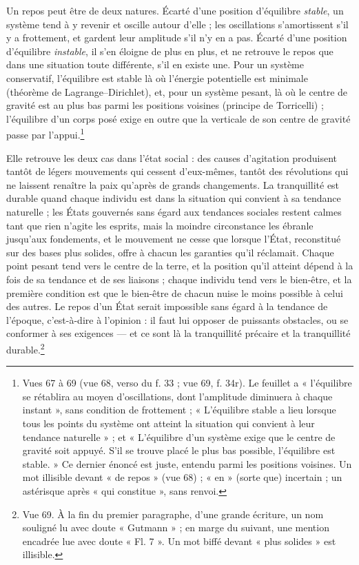 \documentclass[11pt,a4paper]{article}
\begin{document}
Un repos peut être de deux natures. Écarté d'une position d'équilibre
\emph{stable}, un système tend à y revenir et oscille autour d'elle ; les
oscillations s'amortissent s'il y a frottement, et gardent leur amplitude s'il
n'y en a pas. Écarté d'une position d'équilibre \emph{instable}, il s'en éloigne
de plus en plus, et ne retrouve le repos que dans une situation toute
différente, s'il en existe une. Pour un système conservatif, l'équilibre est
stable là où l'énergie potentielle est minimale (théorème de Lagrange–Dirichlet),
et, pour un système pesant, là où le centre de gravité est au plus bas parmi
les positions voisines (principe de Torricelli) ; l'équilibre d'un corps posé
exige en outre que la verticale de son centre de gravité passe par
l'appui.\footnote{Vues 67 à 69 (vue 68, verso du f. 33 ; vue 69, f. 34r). Le
feuillet a « l'équilibre se rétablira au moyen d'oscillations, dont l'amplitude
diminuera à chaque instant », sans condition de frottement ; « L'équilibre
stable a lieu lorsque tous les points du système ont atteint la situation qui
convient à leur tendance naturelle » ; et « L'équilibre d'un système exige que
le centre de gravité soit appuyé. S'il se trouve placé le plus bas possible,
l'équilibre est stable. » Ce dernier énoncé est juste, entendu parmi les
positions voisines. Un mot illisible devant « de repos » (vue 68) ; « en »
(sorte que) incertain ; un astérisque après « qui constitue », sans renvoi.}

Elle retrouve les deux cas dans l'état social : des causes d'agitation produisent
tantôt de légers mouvements qui cessent d'eux-mêmes, tantôt des révolutions qui
ne laissent renaître la paix qu'après de grands changements. La tranquillité
est durable quand chaque individu est dans la situation qui convient à sa
tendance naturelle ; les États gouvernés sans égard aux tendances sociales
restent calmes tant que rien n'agite les esprits, mais la moindre circonstance
les ébranle jusqu'aux fondements, et le mouvement ne cesse que lorsque l'État,
reconstitué sur des bases plus solides, offre à chacun les garanties qu'il
réclamait. Chaque point pesant tend vers le centre de la terre, et la position
qu'il atteint dépend à la fois de sa tendance et de ses liaisons ; chaque
individu tend vers le bien-être, et la première condition est que le bien-être
de chacun nuise le moins possible à celui des autres. Le repos d'un État serait
impossible sans égard à la tendance de l'époque, c'est-à-dire à l'opinion : il
faut lui opposer de puissants obstacles, ou se conformer à ses exigences — et
ce sont là la tranquillité précaire et la tranquillité durable.\footnote{Vue 69.
À la fin du premier paragraphe, d'une grande écriture, un nom souligné lu avec
doute « Gutmann » ; en marge du suivant, une mention encadrée lue avec doute
« Fl. 7 ». Un mot biffé devant « plus solides » est illisible.}
\end{document}
